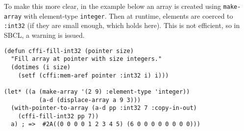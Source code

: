 \documentclass[12pt,a4paper,dvipdfm]{article}
\begin{document}
To make this more clear, in the example below an array is created
using \lstinline!make-array! with element-type \lstinline!integer!.
Then at runtime, elements are coerced to \lstinline!:int32! (if they
are small enough, which holds here).  This is not efficient, so in
SBCL, a warning is issued.

\begin{lstlisting}
(defun cffi-fill-int32 (pointer size)
  "Fill array at pointer with size integers."
  (dotimes (i size)
    (setf (cffi:mem-aref pointer :int32 i) i)))

(let* ((a (make-array '(2 9) :element-type 'integer))
	      (a-d (displace-array a 9 3)))
  (with-pointer-to-array (a-d pp :int32 7 :copy-in-out)
    (cffi-fill-int32 pp 7))
  a) ; =>  #2A((0 0 0 0 1 2 3 4 5) (6 0 0 0 0 0 0 0 0)))
\end{lstlisting}
\end{document}
